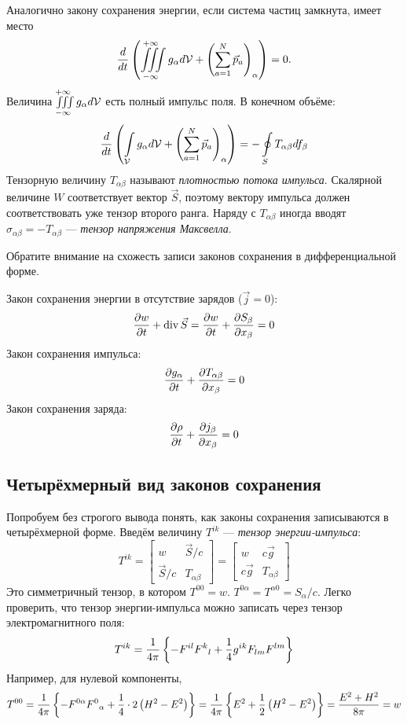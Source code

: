     Аналогично закону сохранения энергии, если система частиц замкнута, имеет место
    \[
        \frac{d}{dt}\left({\iiint\limits_{-\infty}^{+\infty} g_{\alpha}d\mathcal{V} + \left({\sum_{a = 1}^N\vec{p}_a}\right)_{\alpha}}\right) = 0.
    \]
    Величина $\iiint\limits_{-\infty}^{+\infty} g_{\alpha}d\mathcal{V}$ есть полный импульс поля. В конечном объёме:
    \[
        \frac{d}{dt}\left({\int\limits_{\mathcal{V}} g_{\alpha}d\mathcal{V} + \left({\sum_{a = 1}^N\vec{p}_a}\right)_{\alpha}}\right) = 
        -\oint\limits_S T_{\alpha\beta}df_{\beta}
    \]
    Тензорную величину $T_{\alpha\beta}$ называют \textit{плотностью потока импульса}. Скалярной величине $W$ соответствует вектор $\vec{S}$,
    поэтому вектору импульса должен соответствовать уже тензор второго ранга. Наряду с $T_{\alpha\beta}$ иногда вводят 
    $\sigma_{\alpha\beta} = -T_{\alpha\beta}$ --- \textit{тензор напряжения Максвелла}.

    \begin{note}
        Обратите внимание на схожесть записи законов сохранения в дифференциальной форме.

        Закон сохранения энергии в отсутствие зарядов ($\vec{j} = 0$):
        \[
            \frac{\partial w}{\partial t} + \operatorname{div}\vec{S} = \frac{\partial w}{\partial t} + \frac{\partial S_{\beta}}{\partial x_{\beta}} = 0
        \]
        Закон сохранения импульса:
        \[
            \frac{\partial g_{\alpha}}{\partial t} + \frac{\partial T_{\alpha\beta}}{\partial x_{\beta}} = 0
        \]
        Закон сохранения заряда:
        \[
            \frac{\partial\rho}{\partial t} + \frac{\partial j_{\beta}}{\partial x_{\beta}} = 0
        \]
    \end{note}

\subsection{Четырёхмерный вид законов сохранения}
    Попробуем без строгого вывода понять, как законы сохранения записываются в четырёхмерной форме.
    Введём величину $T^{ik}$ --- \textit{тензор энергии-импульса}:
    \[
        T^{ik} = \begin{bmatrix}
            w & \vec{S} / {c} \\
            \vec{S} / {c} & T_{\alpha\beta}
        \end{bmatrix} = 
        \begin{bmatrix}
            w & c\vec{g} \\
            c\vec{g} & T_{\alpha\beta}
        \end{bmatrix}
    \]
    Это симметричный тензор, в котором $T^{00} = w$. $T^{0\alpha} = T^{\alpha 0} =  {S_{\alpha}}/{c}$. Легко проверить,
    что тензор энергии-импульса можно записать через тензор электромагнитного поля:
    \[
        T^{ik} = \frac{1}{4\pi}\left\{{-F^{il}{F^k}_l + \frac 14 g^{ik}F_{lm}F^{lm}}\right\}
    \]
    Например, для нулевой компоненты,
    \[
        T^{00} = \frac{1}{4\pi}\left\{{-F^{0\alpha}{F^0}_{\alpha} + \frac 14 \cdot 2\left({H^2 - E^2}\right)}\right\} =
        \frac{1}{4\pi}\left\{{E^2 + \frac 12 \left({H^2 - E^2}\right)}\right\} = \frac{E^2 + H^2}{8\pi} = w
    \]

